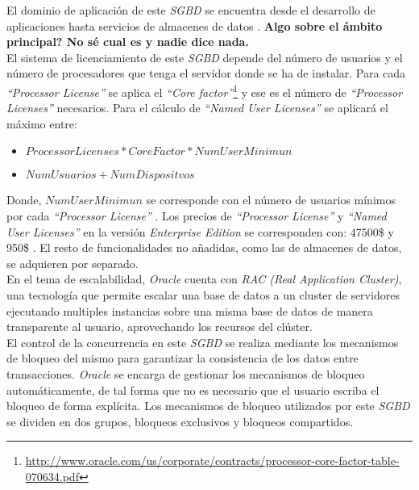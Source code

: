 \documentclass[11pt,a4paper]{article}
\begin{document}
El dominio de aplicación de este \emph{SGBD} se encuentra desde el desarrollo de aplicaciones hasta servicios de almacenes de datos \cite{ORA:2}. 
\textbf{{\LARGE Algo sobre el ámbito principal? No sé cual es y nadie dice nada.}}\\

El sistema de licenciamiento de este \emph{SGBD} depende del número de usuarios y el número de procesadores que tenga el servidor donde se ha de instalar. Para cada \emph{``Processor License''} se aplica el \emph{``Core factor''}\footnote{\url{http://www.oracle.com/us/corporate/contracts/processor-core-factor-table-070634.pdf}} y ese es el número de \emph{``Processor Licenses''} necesarios. Para el cálculo de \emph{``Named User Licenses''} se aplicará el máximo entre:

\begin{itemize}
\item $ProcessorLicenses * CoreFactor * NumUserMinimun$
\item $NumUsuarios + NumDispositvos$
\end{itemize}

Donde, $NumUserMinimun$ se corresponde con el número de usuarios mínimos por cada \emph{``Processor License''} \cite{ORA:3}. Los precios de \emph{``Processor License''} y \emph{``Named User Licenses''} en la versión \emph{Enterprise Edition} se corresponden con: 47500\$ y 950\$ \cite{ORA:4}. El resto de funcionalidades no añadidas, como las de almacenes de datos, se adquieren por separado. \\

En el tema de escalabilidad, \emph{Oracle} cuenta con \emph{RAC (Real Application Cluster)}, una tecnología que permite escalar una base de datos a un cluster de servidores ejecutando multiples instancias sobre una misma base de datos de manera transparente al usuario, aprovechando los recursos del clúster. \cite{ORA:5} \\

El control de la concurrencia en este \emph{SGBD} se realiza mediante los mecanismos de bloqueo del mismo para garantizar la consistencia de los datos entre transacciones. \emph{Oracle} se encarga de gestionar los mecanismos de bloqueo automáticamente, de tal forma que no es necesario que el usuario escriba el bloqueo de forma explícita.\cite{ORA:6}
Los mecanismos de bloqueo utilizados por este \emph{SGBD} se dividen en dos grupos, bloqueos exclusivos y bloqueos compartidos. \cite{ORA:7} \\
\end{document}
